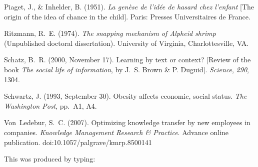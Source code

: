 \documentclass[]{interact}
\theoremstyle{plain}%
\theoremstyle{definition}
\theoremstyle{remark}
\begin{document}
\begin{thebibliography}{}
Piaget, J., \& Inhelder, B. (1951). \emph{La gen{\`e}se de l'id{\'e}e de
 hasard chez l'enfant} [The origin of the idea of chance in the child]. Paris:
 Presses Universitaires de France.

Ritzmann, R.~E. (1974). \emph{The snapping mechanism of \emph{Alpheid} shrimp}
 (Unpublished doctoral dissertation). University of Virginia, Charlottesville,
 VA.

Schatz, B.~R. (2000, November 17). Learning by text or context? [Review of the
 book \emph{The social life of information}, by J.~S. Brown \& P. Duguid].
\emph{Science}, \emph{290}, 1304.

Schwartz, J. (1993, September 30). Obesity affects economic, social status.
 \emph{The Washington Post}, pp.~A1, A4.

Von~Ledebur, S.~C. (2007). Optimizing knowledge transfer by new employees in
 companies. \emph{Knowledge Management Research \& Practice}. Advance online
 publication. doi:10.1057/palgrave/kmrp.8500141

\end{thebibliography}
\bigskip
\noindent This was produced by typing:
\end{document}
